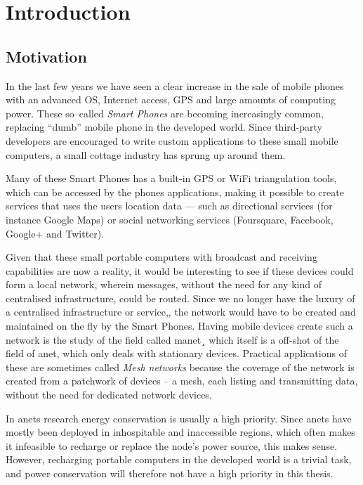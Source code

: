 \section{Introduction}
\label{section:introduction} 

\subsection{Motivation}

In the last few years we have seen a clear increase in the sale of mobile phones with an advanced OS, Internet access, GPS and large amounts of computing power. These so--called \emph{Smart Phones} are becoming increasingly common, replacing ``dumb'' mobile phone in the developed world. Since third-party developers are encouraged to write custom applications to these small mobile computers, a small cottage industry has sprung up around them.
 
Many of these Smart Phones has a built-in GPS or WiFi triangulation tools, which can be accessed by the phones applications, making it possible to create services that uses the users location data --- such as directional services (for instance Google Maps) or social networking services (Foursquare, Facebook, Google+ and Twitter).

Given that these small portable computers with broadcast and receiving capabilities are now a reality, it would be interesting to see if these devices could form a local network, wherein messages, without the need for any kind of centralised infrastructure, could be routed. Since we no longer have the luxury of a centralised infrastructure or service,, the network would have to be created and maintained on the fly by the Smart Phones. Having mobile devices create such a network is the study of the field called \ac{manet}¸ which itself is a off-shot of the field of \ac{anet}, which only deals with stationary devices. Practical applications of these are sometimes called \emph{Mesh networks} because the coverage of the network is created from a patchwork of devices -- a mesh, each listing and transmitting data, without the need for dedicated network devices.  

In \acp{anet} research energy conservation is usually a high priority. Since \acp{anet} have mostly been deployed in inhospitable and inaccessible regions, which often makes it infeasible to recharge or replace the node's power source, this makes sense. However, recharging portable computers in the developed world is a trivial task, and power conservation will therefore not have a high priority in this thesis. 

